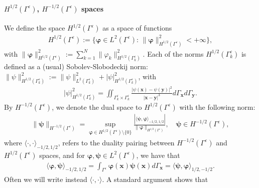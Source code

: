 \documentclass[]{article}
\numberwithin{equation}{section}
\numberwithin{theorem}{section}
\numberwithin{lemma}{section}
\numberwithin{corollary}{section}
\numberwithin{proposition}{section}
\numberwithin{definition}{section}
\newcommand{\bx}{\boldsymbol{x}}
\newcommand{\re}{\varepsilon}
\renewcommand{\vec}{\boldsymbol}
\begin{document}
	\paragraph{$H^{1/2}(\Gamma^{\re})$, $H^{-1/2}(\Gamma^{\re})$ spaces} We define the space $H^{1/2}(\Gamma^{\re})$ as a space of functions
	\begin{align*}%
		H^{1/2}(\Gamma^{\re}):=\{\boldsymbol{\varphi}\in L^2(\Gamma^{\re}):\, \|\boldsymbol{\varphi}\|^2_{H^{1/2}(\Gamma^{\re})}<+\infty\},
	\end{align*} 
	with $\|\boldsymbol{\varphi}\|^2_{H^{1/2}(\Gamma^{\re})}:=\sum\limits_{k=1}^N \|\varphi_k\|^2_{H^{1/2}(\Gamma^{\re}_k)}$.
	Each of the norms $H^{1/2}(\Gamma^{\re}_k)$ is defined as a (usual) Sobolev-Slobodeckij norm: $	\| \psi \|^2_{H^{1/2}(\Gamma^{\re}_k)}:= \| \psi \|^2_{L^2(\Gamma^{\re}_k)} + |\psi|^2_{H^{1/2}(\Gamma^{\re}_k)}$, with
	\begin{align}
		\label{eq:norm_H_half}
		| \psi |_{H^{1/2}(\Gamma^{\re}_k)}^2 = \iint_{\Gamma^{\re}_k\times \Gamma^{\re}_k}\frac{|\psi(\boldsymbol{x})- \psi(\boldsymbol{y})|^2}{|\boldsymbol{x}-\boldsymbol{y}|^3} d\Gamma_{\boldsymbol{x}} d\Gamma_{\boldsymbol{y}}.
	\end{align}
	By $H^{-1/2}(\Gamma^{\re})$, we denote the dual space to $H^{1/2}(\Gamma^{\re})$ with the following norm:
	\begin{align}
		\label{eq:norm_H_minus_half}
		\| \vec{\psi} \|_{H^{-1/2} (\Gamma^{\re})} =  \sup_{\boldsymbol{\varphi}  \in H^{1/2}(\Gamma^{\re}) \setminus \{0\}}  \frac{| \langle \vec{\psi}, \vec{\varphi} \rangle_{-1/2, 1/2} |}{\| \vec{\varphi} \|_{H^{1/2}(\Gamma^{\re})}}, \quad \vec{\psi} \in H^{-1/2}(\Gamma^{\re}),
	\end{align}
	where $\langle \cdot, \cdot \rangle_{-1/2, 1/2}$, refers to the duality pairing between $H^{-1/2}(\Gamma^{\re})$ and $H^{1/2}(\Gamma^{\re})$ spaces, and for $\vec{\varphi}, \vec{\psi} \in L^2(\Gamma^{\re})$, we have that
	\begin{align*}%
		\langle \vec{\varphi}, \vec{\psi} \rangle_{-1/2, 1/2} = \int_{\Gamma^{\re}} {\vec{\varphi}(\bx)} {\vec{\psi}(\bx)} d \Gamma_{\bx}=	\langle \vec{\psi}, \vec{\varphi} \rangle_{1/2, -1/2}.
	\end{align*}
	Often we will write instead $\langle \cdot, \cdot \rangle$. A standard argument shows that
\end{document}
